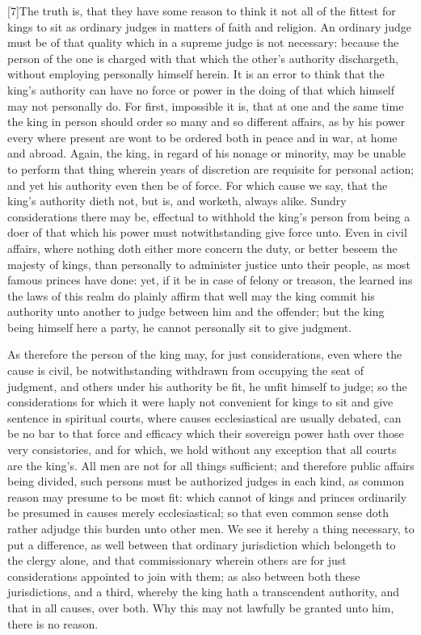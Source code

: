 [7]The truth is, that they have some reason to think it not all of the fittest for kings to sit as ordinary judges in matters of faith and religion. An ordinary judge must be of that quality which in a supreme judge is not necessary:  because the person of the one is charged with that which the other’s authority dischargeth, without employing personally himself herein. It is an error to think that the king’s authority can have no force or power in the doing of that which himself may not personally do. For first, impossible it is, that at one and the same time the king in person should order so many and so different affairs, as by his power every where present are wont to be ordered both in peace and in war, at home and abroad. Again, the king, in regard of his nonage or minority, may be unable to perform that thing wherein years of discretion are requisite for personal action; and yet his authority even then be of force. For which cause we say, that the king’s authority dieth not, but is, and worketh, always alike. Sundry considerations there may be, effectual to withhold the king’s person from being a doer of that which his power must notwithstanding give force unto. Even in civil affairs, where nothing doth either more concern the duty, or better beseem the majesty of kings, than personally to administer justice unto their people, as most famous princes have done: yet, if it be in case of felony or treason, the learned ins the laws of this realm do plainly affirm that well may the king commit his authority unto another to judge between him and the offender; but the king being himself here a party, he cannot personally sit to give judgment.

As therefore the person of the king may, for just considerations, even where the cause is civil, be notwithstanding withdrawn from occupying the seat of judgment, and others under his authority be fit, he unfit himself to judge; so the considerations for which it were haply not convenient for kings to sit and give sentence in spiritual courts, where causes ecclesiastical are usually debated, can be no bar to that force and efficacy which their sovereign power hath over those very consistories, and for which, we hold without any exception that all courts are the king’s. All men are not for all things  sufficient; and therefore public affairs being divided, such persons must be authorized judges in each kind, as common reason may presume to be most fit: which cannot of kings and princes ordinarily be presumed in causes merely ecclesiastical; so that even common sense doth rather adjudge this burden unto other men. We see it hereby a thing necessary, to put a difference, as well between that ordinary jurisdiction which belongeth to the clergy alone, and that commissionary wherein others are for just considerations appointed to join with them; as also between both these jurisdictions, and a third, whereby the king hath a transcendent authority, and that in all causes, over both. Why this may not lawfully be granted unto him, there is no reason.

